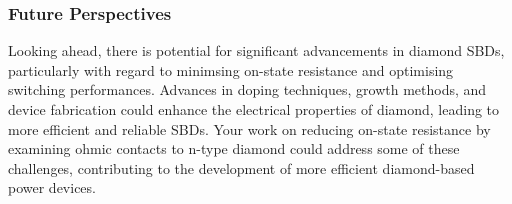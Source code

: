 \subsubsection{Future Perspectives}
Looking ahead, there is potential for significant advancements in diamond SBDs, particularly with regard to minimsing on-state resistance and optimising switching performances. Advances in doping techniques, growth methods, and device fabrication could enhance the electrical properties of diamond, leading to more efficient and reliable SBDs. Your work on reducing on-state resistance by examining ohmic contacts to n-type diamond could address some of these challenges, contributing to the development of more efficient diamond-based power devices.
